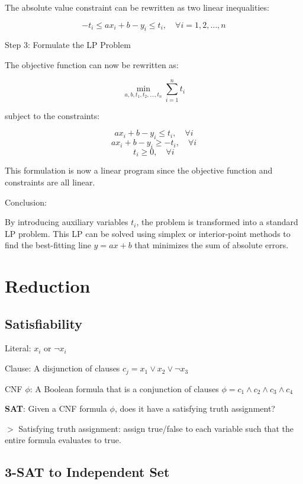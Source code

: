 \documentclass[12pt,a4paper]{article}
\newcommand{\remark}[1]{
    $>$ {\color{blue} #1}
}
\begin{document}
The absolute value constraint can be rewritten as two linear inequalities:

\[
- t_i \leq a x_i + b - y_i \leq t_i, \quad \forall i = 1, 2, \dots, n
\]

Step 3: Formulate the LP Problem

The objective function can now be rewritten as:

\[
\min_{a, b, t_1, t_2, \dots, t_n} \sum_{i=1}^{n} t_i
\]

subject to the constraints:

\[
a x_i + b - y_i \leq t_i, \quad \forall i
\]
\[
a x_i + b - y_i \geq -t_i, \quad \forall i
\]
\[
t_i \geq 0, \quad \forall i
\]

This formulation is now a linear program since the objective function and constraints are all linear.

Conclusion:

By introducing auxiliary variables \( t_i \), the problem is transformed into a standard LP problem. This LP can be solved using simplex or interior-point methods to find the best-fitting line \( y = ax + b \) that minimizes the sum of absolute errors.

\section*{Reduction}



\subsection*{Satisfiability}

Literal: $x_i$ or $\neg x_i$

Clause: A disjunction of clauses $c_j = x_1 \lor x_2 \lor \neg x_3$

CNF $\phi$: A Boolean formula that is a conjunction of clauses \(\phi = c_1 \land c_2 \land c_3 \land c_4\)

\textbf{SAT}: Given a CNF formula $\phi$, does it have a satisfying truth assignment?

\remark{Satisfying truth assignment: assign true/false to each variable such that the entire formula evaluates to true.}

\subsection*{3-SAT to Independent Set}
\end{document}
